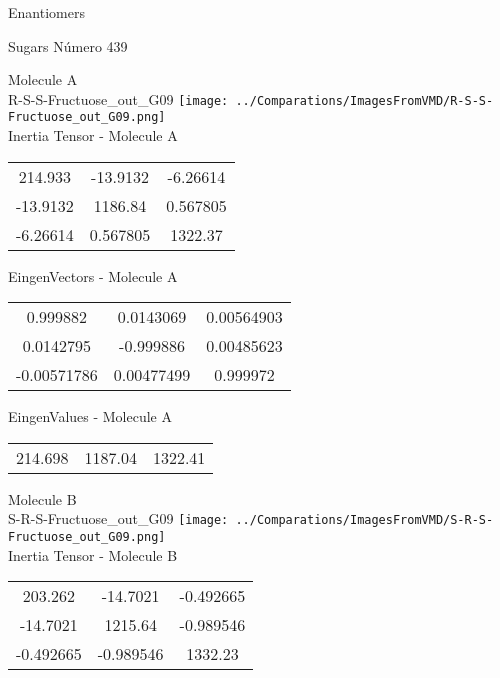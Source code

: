 \begin{center}
\vtab
\vtab
\textcolor{NavyBlue}{\Large Enantiomers}
\end{center}

 \newpage

\vtab[-2cm]
\begin{center}
{\large Sugars \tab Número 439}
\end{center}
\begin{multicols}{2}
\begin{center}

Molecule A \\ 
R-S-S-Fructuose\_out\_G09
\texttt{[image: ../Comparations/ImagesFromVMD/R-S-S-Fructuose\_out\_G09.png]}
\\
Inertia Tensor - Molecule A \\
\vtab

\begin{tabular}{|c c c|}
214.933	 & 	-13.9132	 & 	-6.26614	 \\
-13.9132	 & 	1186.84	 & 	0.567805	 \\
-6.26614	 & 	0.567805	 & 	1322.37
\end{tabular}

\vtab
 EingenVectors - Molecule A     \\
\vtab
\begin{tabular}{|c c c|}
0.999882	 & 	0.0143069	 & 	0.00564903	 \\
0.0142795	 & 	-0.999886	 & 	0.00485623	 \\
-0.00571786	 & 	0.00477499	 & 	0.999972
\end{tabular}

\vtab
 EingenValues - Molecule A     \\
\vtab
\begin{tabular}{|c c c|}
214.698	 & 	1187.04	 & 	1322.41	 \\
\end{tabular}
\columnbreak

Molecule B \\ 
S-R-S-Fructuose\_out\_G09
\texttt{[image: ../Comparations/ImagesFromVMD/S-R-S-Fructuose\_out\_G09.png]}
\\
Inertia Tensor - Molecule B \\
\vtab

\begin{tabular}{|c c c|}
203.262	 & 	-14.7021	 & 	-0.492665	 \\
-14.7021	 & 	1215.64	 & 	-0.989546	 \\
-0.492665	 & 	-0.989546	 & 	1332.23
\end{tabular}


\end{center}
\end{multicols}
